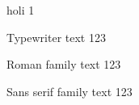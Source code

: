 \documentclass{presentacion}
\begin{document}
\begin{frame}

holi 1


{\ttfamily Typewriter text 123}

{\rmfamily Roman family text 123}

{\sffamily Sans serif family text 123}

\end{frame}
\end{document}
